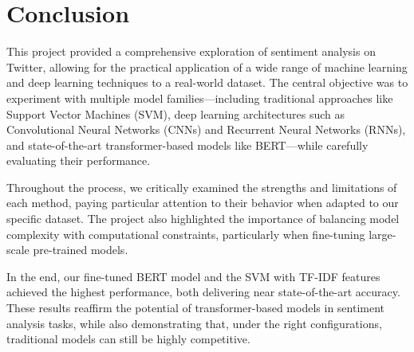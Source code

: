 \section{Conclusion}

This project provided a comprehensive exploration of sentiment analysis on Twitter, allowing for the practical application of a wide range of machine learning and deep learning techniques to a real-world dataset. The central objective was to experiment with multiple model families—including traditional approaches like Support Vector Machines (SVM), deep learning architectures such as Convolutional Neural Networks (CNNs) and Recurrent Neural Networks (RNNs), and state-of-the-art transformer-based models like BERT—while carefully evaluating their performance.

Throughout the process, we critically examined the strengths and limitations of each method, paying particular attention to their behavior when adapted to our specific dataset. The project also highlighted the importance of balancing model complexity with computational constraints, particularly when fine-tuning large-scale pre-trained models.

In the end, our fine-tuned BERT model and the SVM with TF-IDF features achieved the highest performance, both delivering near state-of-the-art accuracy. These results reaffirm the potential of transformer-based models in sentiment analysis tasks, while also demonstrating that, under the right configurations, traditional models can still be highly competitive. 
